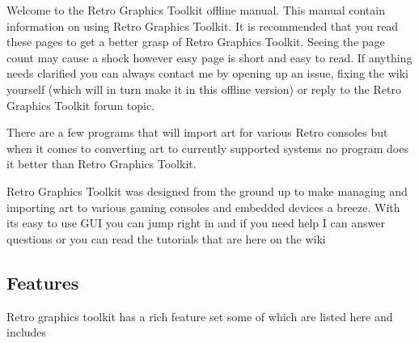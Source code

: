 Welcome to the Retro Graphics Toolkit offline manual. This manual contain
information on using Retro Graphics Toolkit. It is recommended that you
read these pages to get a better grasp of Retro Graphics Toolkit.
Seeing the page count may cause a shock however easy page is short and easy to read.
If anything needs clarified you can always contact me by opening
up an issue, fixing the wiki yourself (which will in turn make it in this offline version) or reply to the Retro Graphics
Toolkit forum topic.

There are a few programs that will import art for various Retro consoles
but when it comes to converting art to currently supported systems no
program does it better than Retro Graphics Toolkit.

Retro Graphics Toolkit was designed from the ground up to make managing
and importing art to various gaming consoles and embedded devices a
breeze. With its easy to use GUI you can jump right in and if you need
help I can answer questions or you can read the tutorials that are here
on the wiki

\subsection{Features}\label{features}

Retro graphics toolkit has a rich feature set some of which are listed
here and includes

